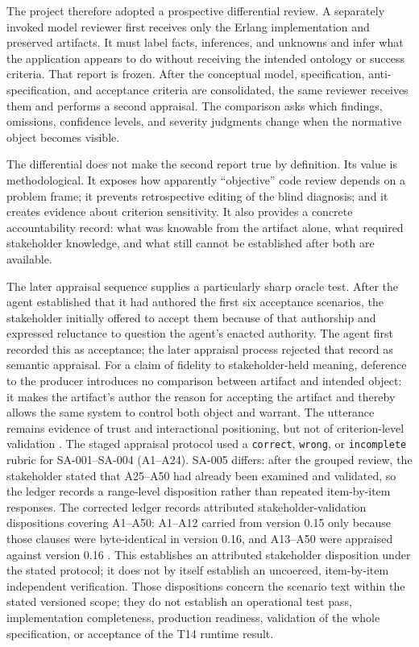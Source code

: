 \documentclass[10pt,a4paper]{article}
\begin{document}
The project therefore adopted a prospective differential review. A separately invoked model reviewer first receives only the Erlang implementation and preserved artifacts. It must label facts, inferences, and unknowns and infer what the application appears to do without receiving the intended ontology or success criteria. That report is frozen. After the conceptual model, specification, anti-specification, and acceptance criteria are consolidated, the same reviewer receives them and performs a second appraisal. The comparison asks which findings, omissions, confidence levels, and severity judgments change when the normative object becomes visible.

The differential does not make the second report true by definition. Its value is methodological. It exposes how apparently ``objective'' code review depends on a problem frame; it prevents retrospective editing of the blind diagnosis; and it creates evidence about criterion sensitivity. It also provides a concrete accountability record: what was knowable from the artifact alone, what required stakeholder knowledge, and what still cannot be established after both are available.

The later appraisal sequence supplies a particularly sharp oracle test. After the agent established that it had authored the first six acceptance scenarios, the stakeholder initially offered to accept them because of that authorship and expressed reluctance to question the agent's enacted authority. The agent first recorded this as acceptance; the later appraisal process rejected that record as semantic appraisal. For a claim of fidelity to stakeholder-held meaning, deference to the producer introduces no comparison between artifact and intended object: it makes the artifact's author the reason for accepting the artifact and thereby allows the same system to control both object and warrant. The utterance remains evidence of trust and interactional positioning, but not of criterion-level validation \cite{sessionrecord}. The staged appraisal protocol used a \texttt{correct}, \texttt{wrong}, or \texttt{incomplete} rubric for SA-001--SA-004 (A1--A24). SA-005 differs: after the grouped review, the stakeholder stated that A25--A50 had already been examined and validated, so the ledger records a range-level disposition rather than repeated item-by-item responses. The corrected ledger records attributed stakeholder-validation dispositions covering A1--A50: A1--A12 carried from version 0.15 only because those clauses were byte-identical in version 0.16, and A13--A50 were appraised against version 0.16 \cite{stakeholderledger}. This establishes an attributed stakeholder disposition under the stated protocol; it does not by itself establish an uncoerced, item-by-item independent verification. Those dispositions concern the scenario text within the stated versioned scope; they do not establish an operational test pass, implementation completeness, production readiness, validation of the whole specification, or acceptance of the T14 runtime result.
\end{document}
